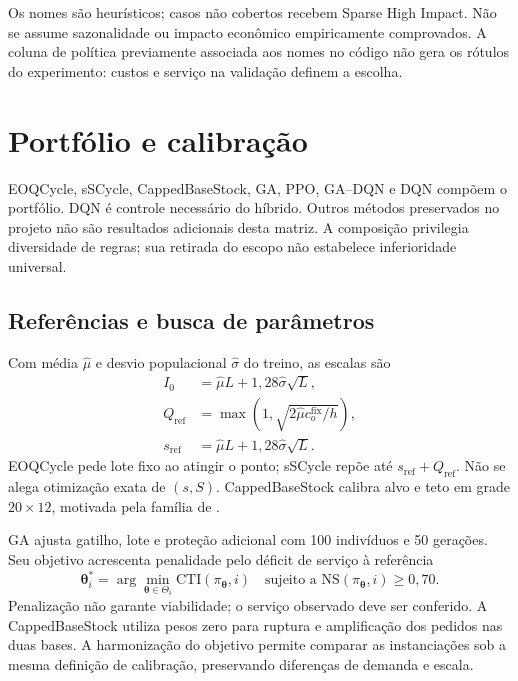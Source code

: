 Os nomes são heurísticos; casos não cobertos recebem Sparse High Impact. Não se assume sazonalidade ou impacto econômico empiricamente comprovados. A coluna de política previamente associada aos nomes no código não gera os rótulos do experimento: custos e serviço na validação definem a escolha.

\section{Portfólio e calibração}
\label{sec:benchmark_massivo}\label{sec:portfolio_ampliado}
EOQCycle, sSCycle, CappedBaseStock, GA, PPO, GA--DQN e DQN compõem o portfólio. DQN é controle necessário do híbrido. Outros métodos preservados no projeto não são resultados adicionais desta matriz. A composição privilegia diversidade de regras; sua retirada do escopo não estabelece inferioridade universal.

\subsection{Referências e busca de parâmetros}
\label{sec:sinais_previsao}\label{sec:redundancia_portfolio}
Com média $\hat\mu$ e desvio populacional $\hat\sigma$ do treino, as escalas são
\begin{align}
 I_0&=\hat\mu L+1{,}28\hat\sigma\sqrt L,\label{eq:I0_metod}\\
 Q_{\mathrm{ref}}&=\max(1,\sqrt{2\hat\mu c_o^{\mathrm{fix}}/h}),\label{eq:qref_metod}\\
 s_{\mathrm{ref}}&=\hat\mu L+1{,}28\hat\sigma\sqrt L.\label{eq:sref_metod}
\end{align}
EOQCycle pede lote fixo ao atingir o ponto; sSCycle repõe até $s_{\mathrm{ref}}+Q_{\mathrm{ref}}$. Não se alega otimização exata de $(s,S)$. CappedBaseStock calibra alvo e teto em grade $20\times12$, motivada pela família de \citet{Xin2021CappedBaseStock}.

GA ajusta gatilho, lote e proteção adicional com 100 indivíduos e 50 gerações. Seu objetivo acrescenta penalidade pelo déficit de serviço à referência
\begin{equation}
 \boldsymbol\theta_i^*=\arg\min_{\boldsymbol\theta\in\Theta_i}\mathrm{CTI}(\pi_{\boldsymbol\theta},i)
 \quad\text{sujeito a }\mathrm{NS}(\pi_{\boldsymbol\theta},i)\geq0{,}70.
 \label{eq:obj_metaheuristicas}
\end{equation}
Penalização não garante viabilidade; o serviço observado deve ser conferido. A CappedBaseStock utiliza pesos zero para ruptura e amplificação dos pedidos nas duas bases. A harmonização do objetivo permite comparar as instanciações sob a mesma definição de calibração, preservando diferenças de demanda e escala.

